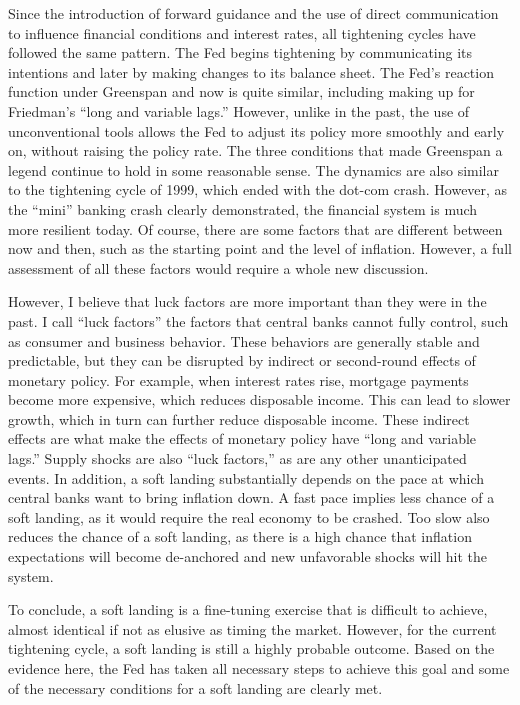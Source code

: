 \documentclass[
  letterpaper,
  DIV=11,
  numbers=noendperiod]{scrartcl}
\begin{document}
Since the introduction of forward guidance and the use of direct
communication to influence financial conditions and interest rates, all
tightening cycles have followed the same pattern. The Fed begins
tightening by communicating its intentions and later by making changes
to its balance sheet. The Fed's reaction function under Greenspan and
now is quite similar, including making up for Friedman's ``long and
variable lags.'' However, unlike in the past, the use of unconventional
tools allows the Fed to adjust its policy more smoothly and early on,
without raising the policy rate. The three conditions that made
Greenspan a legend continue to hold in some reasonable sense. The
dynamics are also similar to the tightening cycle of 1999, which ended
with the dot-com crash. However, as the ``mini'' banking crash clearly
demonstrated, the financial system is much more resilient today. Of
course, there are some factors that are different between now and then,
such as the starting point and the level of inflation. However, a full
assessment of all these factors would require a whole new discussion.

However, I believe that luck factors are more important than they were
in the past. I call ``luck factors'' the factors that central banks
cannot fully control, such as consumer and business behavior. These
behaviors are generally stable and predictable, but they can be
disrupted by indirect or second-round effects of monetary policy. For
example, when interest rates rise, mortgage payments become more
expensive, which reduces disposable income. This can lead to slower
growth, which in turn can further reduce disposable income. These
indirect effects are what make the effects of monetary policy have
``long and variable lags.'' Supply shocks are also ``luck factors,'' as
are any other unanticipated events. In addition, a soft landing
substantially depends on the pace at which central banks want to bring
inflation down. A fast pace implies less chance of a soft landing, as it
would require the real economy to be crashed. Too slow also reduces the
chance of a soft landing, as there is a high chance that inflation
expectations will become de-anchored and new unfavorable shocks will hit
the system.

To conclude, a soft landing is a fine-tuning exercise that is difficult
to achieve, almost identical if not as elusive as timing the market.
However, for the current tightening cycle, a soft landing is still a
highly probable outcome. Based on the evidence here, the Fed has taken
all necessary steps to achieve this goal and some of the necessary
conditions for a soft landing are clearly met.
\end{document}
